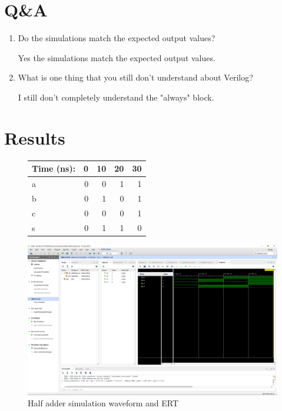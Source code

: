 \documentclass[11pt]{article}
\begin{document}
\FloatBarrier
\section*{Q\&A}

\begin{enumerate}
	\item Do the simulations match the expected output values?
		
		Yes the simulations match the expected output values.
		
	\item What is one thing that you still don't understand about Verilog?
	
		I still don't completely understand the "always" block.
		
\end{enumerate}


\section*{Results}

\begin{figure}[ht]\centering
	\begin{tabular}{l|rrrr}
		Time (ns): & 0 & 10 & 20 & 30 \\
		\midrule
		a & 0 & 0 & 1 & 1 \\
		b & 0 & 1 & 0 & 1 \\
		\midrule
		c & 0 & 0 & 0 & 1 \\
		s & 0 & 1 & 1 & 0 \\
		\bottomrule
	\end{tabular}\medskip
	
	\includegraphics[width=1\textwidth,trim=19cm 15cm 0.5cm 4.5cm,clip]{lab05_halfadder_screenshot}
	\caption{Half adder simulation waveform and ERT}
	\label{fig:sim_with_table}
\end{figure}
\end{document}
